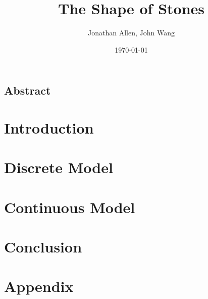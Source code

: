 \documentclass[12pt]{amsart}   %
\begin{document}
\graphicspath{ {figures/} }

\title[Shape of Stones]{The Shape of Stones}
 
\author{Jonathan Allen, John Wang}
\date{\today}

\maketitle

\subsection*{Abstract}

\section{Introduction}


\section{Discrete Model}


\section{Continuous Model}


\section{Conclusion}


\section*{Appendix}



\end{document}
